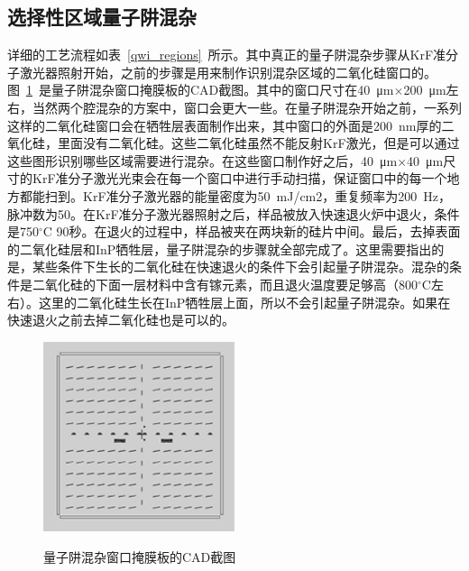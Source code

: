 \documentclass{ZJUthesis}
\begin{document}
\subsection{选择性区域量子阱混杂}

详细的工艺流程如表~\ref{qwi_regions}~所示。其中真正的量子阱混杂步骤从KrF准分子激光器照射开始，之前的步骤是用来制作识别混杂区域的二氧化硅窗口的。图~\ref{fig_windows}~是量子阱混杂窗口掩膜板的CAD截图。其中的窗口尺寸在40~μm$\times$200~μm左右，当然两个腔混杂的方案中，窗口会更大一些。在量子阱混杂开始之前，一系列这样的二氧化硅窗口会在牺牲层表面制作出来，其中窗口的外面是200~nm厚的二氧化硅，里面没有二氧化硅。这些二氧化硅虽然不能反射KrF激光，但是可以通过这些图形识别哪些区域需要进行混杂。在这些窗口制作好之后，40~μm$\times$40~μm尺寸的KrF准分子激光光束会在每一个窗口中进行手动扫描，保证窗口中的每一个地方都能扫到。KrF准分子激光器的能量密度为50~mJ/cm2，重复频率为200~Hz，脉冲数为50。在KrF准分子激光器照射之后，样品被放入快速退火炉中退火，条件是750$^{\circ}$C 90秒。在退火的过程中，样品被夹在两块新的硅片中间。最后，去掉表面的二氧化硅层和InP牺牲层，量子阱混杂的步骤就全部完成了。这里需要指出的是，某些条件下生长的二氧化硅在快速退火的条件下会引起量子阱混杂。混杂的条件是二氧化硅的下面一层材料中含有镓元素，而且退火温度要足够高（800$^{\circ}$C左右）。这里的二氧化硅生长在InP牺牲层上面，所以不会引起量子阱混杂。如果在快速退火之前去掉二氧化硅也是可以的。

\begin{figure}[htbp]
  \centering
  \includegraphics[width=0.5\textwidth]{./Pictures/windows.eps}\\
  \caption{量子阱混杂窗口掩膜板的CAD截图}
  \label{fig_windows}
\end{figure}
\end{document}
